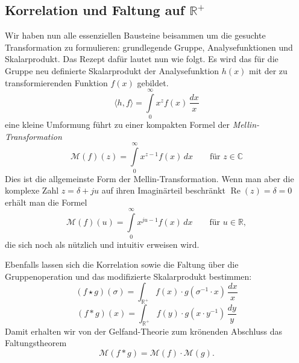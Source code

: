 \subsection{Korrelation und Faltung auf $\mathbb{R^+}$
\label{mellin:subsection:faltung}}
Wir haben nun alle essenziellen Bausteine beisammen um die gesuchte 
Transformation zu formulieren: grundlegende Gruppe, Analysefunktionen 
und Skalarprodukt.
Das Rezept dafür lautet nun wie folgt. Es wird das für die Gruppe neu 
definierte Skalarprodukt der Analysefunktion $h(x)$ mit der zu 
transformierenden Funktion $f(x)$ gebildet.
\begin{equation}
    \langle h,f \rangle 
    = \int\limits_{0}^{\infty} x^{z} f(x) \,\frac{{d}x}{x}
\end{equation}
eine kleine Umformung führt zu einer kompakten Formel der 
{\em Mellin-Transformation}
\begin{equation}
    \mathcal{M}(f)(z) 
    = \int\limits_{0}^{\infty} x^{z-1} f(x) \,{d}x 
    \qquad\text{für $z \in \mathbb{C}$}
    \label{mellin:mellin}
\end{equation}
Dies ist die allgemeinste Form der Mellin-Transformation. 
Wenn man aber die komplexe Zahl $z = \delta + ju$ auf ihren Imaginärteil 
beschränkt $\operatorname{Re}(z) = \delta = 0$ erhält man die Formel
\begin{equation}
    \mathcal{M}(f)(u) 
    = \int\limits_{0}^{\infty} x^{ju-1} f(x) \,{d}x 
    \qquad\text{für $u \in \mathbb{R}$}
    ,
    \label{mellin:mellinu}
\end{equation}
die sich noch als nützlich und intuitiv erweisen wird.

Ebenfalls lassen sich die Korrelation sowie die Faltung über die 
Gruppenoperation und das modifizierte Skalarprodukt bestimmen:
\begin{equation}
    (f \star g)(\sigma ) 
    = \int_\mathbb{R^+} 
    f(x) \cdot g(\sigma ^{-1} \cdot x)\,\frac{{d}x}{x}
    \label{mellin:kreuzkorrelation*}
\end{equation}
\begin{equation}
    (f \ast g)(x) 
    = \int_\mathbb{R^+} 
    f(y) \cdot g(x \cdot y^{-1})\,\frac{{d}y}{y} 
\end{equation}
Damit erhalten wir von der Gelfand-Theorie zum krönenden Abschluss das 
Faltungstheorem
\begin{equation}
    \mathcal{M}\left(f \ast g\right)
    = \mathcal{M}\left(f\right) \cdot \mathcal{M}\left(g\right)
    .
\end{equation}

